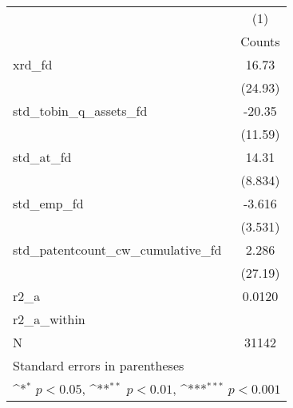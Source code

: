 {
\def\sym#1{\ifmmode^{#1}\else\(^{#1}\)\fi}
\begin{tabular}{l*{1}{c}}
\hline\hline
            &\multicolumn{1}{c}{(1)}\\
            &\multicolumn{1}{c}{Counts}\\
\hline
xrd\_fd      &       16.73         \\
            &     (24.93)         \\
[1em]
std\_tobin\_q\_assets\_fd&      -20.35         \\
            &     (11.59)         \\
[1em]
std\_at\_fd   &       14.31         \\
            &     (8.834)         \\
[1em]
std\_emp\_fd  &      -3.616         \\
            &     (3.531)         \\
[1em]
std\_patentcount\_cw\_cumulative\_fd&       2.286         \\
            &     (27.19)         \\
\hline
r2\_a        &      0.0120         \\
r2\_a\_within &                     \\
N           &       31142         \\
\hline\hline
\multicolumn{2}{l}{\footnotesize Standard errors in parentheses}\\
\multicolumn{2}{l}{\footnotesize \sym{*} \(p<0.05\), \sym{**} \(p<0.01\), \sym{***} \(p<0.001\)}\\
\end{tabular}
}
